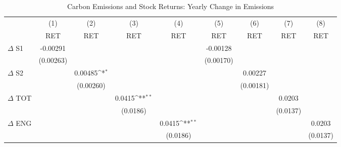 \begin{table}[htbp]\centering
\def\sym#1{\ifmmode^{#1}\else\(^{#1}\)\fi}
\caption{Carbon Emissions and Stock Returns: Yearly Change in Emissions}
\begin{tabular}{l*{8}{c}}
\hline\hline
                    &\multicolumn{1}{c}{(1)}&\multicolumn{1}{c}{(2)}&\multicolumn{1}{c}{(3)}&\multicolumn{1}{c}{(4)}&\multicolumn{1}{c}{(5)}&\multicolumn{1}{c}{(6)}&\multicolumn{1}{c}{(7)}&\multicolumn{1}{c}{(8)}\\
                    &\multicolumn{1}{c}{RET}&\multicolumn{1}{c}{RET}&\multicolumn{1}{c}{RET}&\multicolumn{1}{c}{RET}&\multicolumn{1}{c}{RET}&\multicolumn{1}{c}{RET}&\multicolumn{1}{c}{RET}&\multicolumn{1}{c}{RET}\\
\hline
$\Delta$ S1         &    -0.00291         &                     &                     &                     &    -0.00128         &                     &                     &                     \\
                    &   (0.00263)         &                     &                     &                     &   (0.00170)         &                     &                     &                     \\
$\Delta$ S2         &                     &     0.00485\sym{*}  &                     &                     &                     &     0.00227         &                     &                     \\
                    &                     &   (0.00260)         &                     &                     &                     &   (0.00181)         &                     &                     \\
$\Delta$ TOT        &                     &                     &      0.0415\sym{**} &                     &                     &                     &      0.0203         &                     \\
                    &                     &                     &    (0.0186)         &                     &                     &                     &    (0.0137)         &                     \\
$\Delta$ ENG        &                     &                     &                     &      0.0415\sym{**} &                     &                     &                     &      0.0203         \\
                    &                     &                     &                     &    (0.0186)         &                     &                     &                     &    (0.0137)         \\

\end{tabular}
\end{table}
